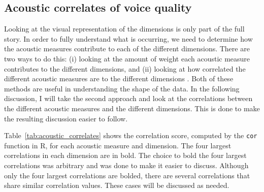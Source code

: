 \subsection{Acoustic correlates of voice quality} \label{sec:acousticlandscape:correlates}

Looking at the visual representation of the dimensions is only part of the full story. In order to fully understand what is occurring, we need to determine how the acoustic measures contribute to each of the different dimensions. There are two ways to do this: (i) looking at the amount of weight each acoustic measure contributes to the different dimensions, and (ii) looking at how correlated the different acoustic measures are to the different dimensions \citep{kruskalMultidimensionalScaling1978,hastieElementsStatisticalLearning2009}. Both of these methods are useful in understanding the shape of the data. In the following discussion, I will take the second approach and look at the correlations between the different acoustic measures and the different dimensions. This is done to make the resulting discussion easier to follow.   

Table~\ref{tab:acoustic_correlates} shows the correlation score, computed by the \texttt{cor} function in R, for each acoustic measure and dimension. The four largest correlations in each dimension are in bold. The choice to bold the four largest correlations was arbitrary and was done to make it easier to discuss. Although only the four largest correlations are bolded, there are several correlations that share similar correlation values. These cases will be discussed as needed.

